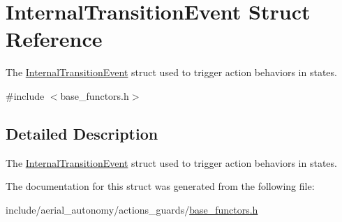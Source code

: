 \hypertarget{structInternalTransitionEvent}{\section{Internal\-Transition\-Event Struct Reference}
\label{structInternalTransitionEvent}
}


The \hyperlink{structInternalTransitionEvent}{Internal\-Transition\-Event} struct used to trigger action behaviors in states.  




{\ttfamily \#include $<$base\-\_\-functors.\-h$>$}



\subsection{Detailed Description}
The \hyperlink{structInternalTransitionEvent}{Internal\-Transition\-Event} struct used to trigger action behaviors in states. 

The documentation for this struct was generated from the following file\-:\begin{DoxyCompactItemize}
\item 
include/aerial\-\_\-autonomy/actions\-\_\-guards/\hyperlink{base__functors_8h}{base\-\_\-functors.\-h}\end{DoxyCompactItemize}
